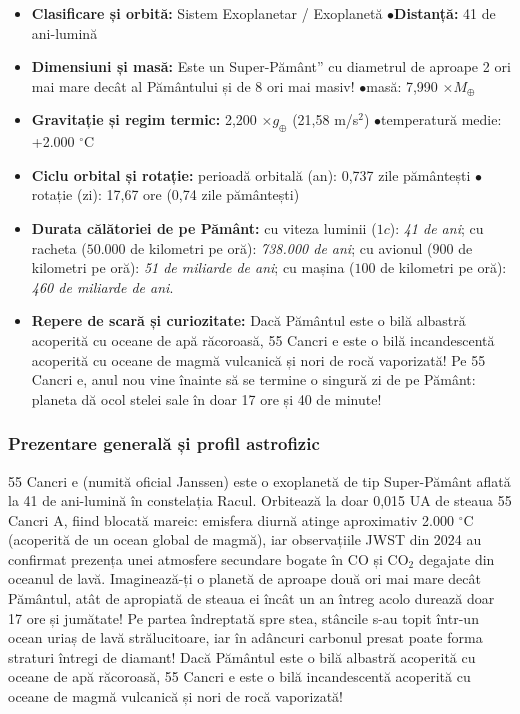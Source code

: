 \begin{tcolorbox}[orbitardata, title={\textbf{Repere esențiale: Exoplaneta 55 Cancri e (Janssen)}}]
\small
\begin{itemize}[leftmargin=1.4em, itemsep=2pt, topsep=2pt]
  \item \textbf{Clasificare și orbită:} Sistem Exoplanetar / Exoplanetă \quad$\bullet$\quad \textbf{Distanță:} 41 de ani-lumină
  \item \textbf{Dimensiuni și masă:} Este un \quotedblbase{}Super-Pământ\textquotedblright{} cu diametrul de aproape 2 ori mai mare decât al Pământului și de 8 ori mai masiv! \quad$\bullet$\quad masă: 7,990 $\times M_\oplus$
  \item \textbf{Gravitație și regim termic:} 2,200 $\times g_\oplus$ (21,58 m/s$^2$) \quad$\bullet$\quad temperatură medie: +2.000 $^\circ$C
  \item \textbf{Ciclu orbital și rotație:} perioadă orbitală (an): 0,737 zile pământești \quad$\bullet$\quad rotație (zi): 17,67 ore (0,74 zile pământești)
  \item \textbf{Durata călătoriei de pe Pământ:} cu viteza luminii ($1c$): \emph{41 de ani}; cu racheta ($50.000$ de kilometri pe oră): \emph{738.000 de ani}; cu avionul ($900$ de kilometri pe oră): \emph{51 de miliarde de ani}; cu mașina ($100$ de kilometri pe oră): \emph{460 de miliarde de ani}.
  \item \textbf{Repere de scară și curiozitate:} Dacă Pământul este o bilă albastră acoperită cu oceane de apă răcoroasă, 55 Cancri e este o bilă incandescentă acoperită cu oceane de magmă vulcanică și nori de rocă vaporizată! Pe 55 Cancri e, anul nou vine înainte să se termine o singură zi de pe Pământ: planeta dă ocol stelei sale în doar 17 ore și 40 de minute!
\end{itemize}
\end{tcolorbox}

\subsubsection*{Prezentare generală și profil astrofizic}
55 Cancri e (numită oficial Janssen) este o exoplanetă de tip Super-Pământ aflată la 41 de ani-lumină în constelația Racul. Orbitează la doar 0,015 UA de steaua 55 Cancri A, fiind blocată mareic: emisfera diurnă atinge aproximativ 2.000 $^\circ$C (acoperită de un ocean global de magmă), iar observațiile JWST din 2024 au confirmat prezența unei atmosfere secundare bogate în CO și CO$_2$ degajate din oceanul de lavă. Imaginează-ți o planetă de aproape două ori mai mare decât Pământul, atât de apropiată de steaua ei încât un an întreg acolo durează doar 17 ore și jumătate! Pe partea îndreptată spre stea, stâncile s-au topit într-un ocean uriaș de lavă strălucitoare, iar în adâncuri carbonul presat poate forma straturi întregi de diamant! Dacă Pământul este o bilă albastră acoperită cu oceane de apă răcoroasă, 55 Cancri e este o bilă incandescentă acoperită cu oceane de magmă vulcanică și nori de rocă vaporizată!

